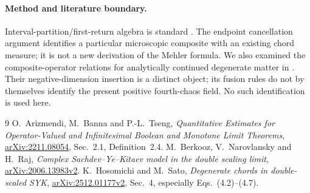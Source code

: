 \documentclass[11pt,a4paper]{article}
\begin{document}
\paragraph{Method and literature boundary.}
Interval-partition/first-return algebra is standard \cite{ABT}.
The endpoint cancellation argument identifies a particular microscopic
composite with an existing chord measure; it is not a new derivation
of the Mehler formula. We also examined the composite-operator
relations for analytically continued degenerate matter in
\cite{HS}. Their negative-dimension insertion is a distinct object;
its fusion rules do not by themselves identify the present positive
fourth-chaos field. No such identification is used here.

\begin{thebibliography}{9}
 O.~Arizmendi, M.~Banna and P.-L.~Tseng,
\emph{Quantitative Estimates for Operator-Valued and Infinitesimal
Boolean and Monotone Limit Theorems},
\href{https://arxiv.org/abs/2211.08054}{arXiv:2211.08054},
Sec.~2.1, Definition~2.4.
 M.~Berkooz, V.~Narovlansky and H.~Raj,
\emph{Complex Sachdev--Ye--Kitaev model in the double scaling limit},
\href{https://arxiv.org/abs/2006.13983v2}{arXiv:2006.13983v2}.
 K.~Hosomichi and M.~Sato,
\emph{Degenerate chords in double-scaled SYK},
\href{https://arxiv.org/abs/2512.01177v2}{arXiv:2512.01177v2},
Sec.~4, especially Eqs.~(4.2)--(4.7).
\end{thebibliography}
\end{document}
